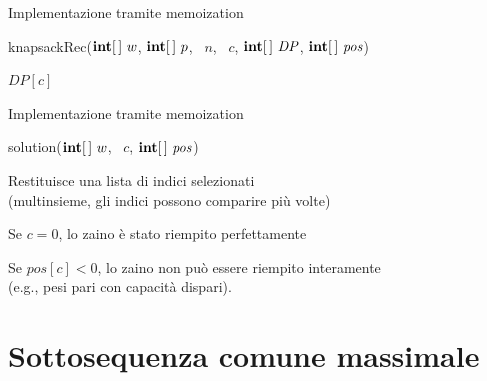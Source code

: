 \begin{frame}{Implementazione tramite memoization}

\vspace{-6pt}
\begin{Procedure}
\caption[A]{\textsf{knapsackRec}($\INTEGER[\,]\ w$, $\INTEGER[\,]\ p$, \INTEGER\ $n$, \INTEGER\ $c$, $\INTEGER[\,]\ \mathit{DP}$, \alert{$\INTEGER[\,]\ \mathit{\mathit{pos}}$})}
\Return $\mathit{DP}[c]$\;
\end{Procedure}
\end{frame}

\begin{frame}{Implementazione tramite memoization}

\vspace{-6pt}
\begin{Procedure}
\caption[A]{\textsf{solution}($\INTEGER[\,]\ w$, \INTEGER\ $c$, 
\alert{$\INTEGER[\,]\ \mathit{\mathit{pos}}$})}
\end{Procedure}

\BIL
\item Restituisce una \alert{lista} di indici selezionati\\ 
(\alert{multinsieme}, gli indici possono
comparire più volte)
\item Se $c=0$, lo zaino è stato riempito perfettamente
\item Se $pos[c] < 0$, lo zaino non può essere riempito interamente\\
(e.g., pesi pari con capacità dispari).
\EIL

\end{frame}



\section{Sottosequenza comune massimale}

